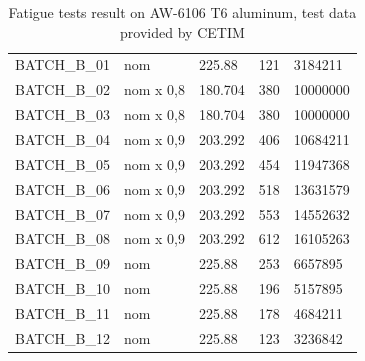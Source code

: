 \begin{table}[!h]
\begin{tabular}{lllll}
BATCH\_B\_01      & nom                & 225.88                               & 121                                      & 3184211                              \\
BATCH\_B\_02      & nom x 0,8          & 180.704                              & 380                                      & 10000000                             \\
BATCH\_B\_03      & nom x 0,8          & 180.704                              & 380                                      & 10000000                             \\
BATCH\_B\_04      & nom x 0,9          & 203.292                              & 406                                      & 10684211                             \\
BATCH\_B\_05      & nom x 0,9          & 203.292                              & 454                                      & 11947368                             \\
BATCH\_B\_06      & nom x 0,9          & 203.292                              & 518                                      & 13631579                             \\
BATCH\_B\_07      & nom x 0,9          & 203.292                              & 553                                      & 14552632                             \\
BATCH\_B\_08      & nom x 0,9          & 203.292                              & 612                                      & 16105263                             \\
BATCH\_B\_09      & nom                & 225.88                               & 253                                      & 6657895                              \\
BATCH\_B\_10      & nom                & 225.88                               & 196                                      & 5157895                              \\
BATCH\_B\_11      & nom                & 225.88                               & 178                                      & 4684211                              \\
BATCH\_B\_12      & nom                & 225.88                               & 123                                      & 3236842                              \\ \hline
\end{tabular}
\caption{Fatigue tests result on AW-6106 T6 aluminum, test data provided by CETIM}
\label{tab:Cetim}
\end{table}

